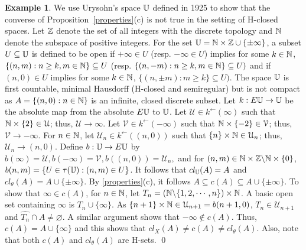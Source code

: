 \documentclass[11pt]{amsart}
\newif\ifdraft\draftfalse
\theoremstyle{definition}
\newtheorem{example}[theorem]{Example}
\theoremstyle{remark}
\numberwithin{equation}{section}
\begin{document}
\vskip 3mm

\begin{example}{{\immediate{}}{\ifdraft\hspace{-\lastskip}\vadjust{\vspace{-1mm}\smash{\llap{{\tt {{Urys}}}\hspace{8mm}}}\vspace{1mm}}\fi}}
We use Urysohn's space  $\Bbb U$ defined in 1925 to show that the converse of Proposition~\ref{properties}(c)  is not true in the setting of H-closed spaces.  Let $\Bbb Z$
denote the set of all integers with the discrete topology and $\Bbb N$
denote the subspace of positive integers.
  For the set $\Bbb U  = \Bbb N \times
\Bbb Z \cup \{\pm \infty\}$, a subset $U\subseteq \Bbb U$  is defined to be
open  if $+\infty\in U$
(resp. $-\infty\in U$) implies for some
$k\in {\Bbb N}$, $\{(n,m):n\geq k, m\in {\Bbb N} \}\subseteq U$ (resp.
$\{({n},{-m}):n\geq k, m\in
{\Bbb N}\}\subseteq U)$ and if $(n,0) \in U$ implies for some $k\in {\Bbb
N}$, $\{({n},{\pm m}):m\geq k
\}\subseteq U)$. The space $\Bbb U$ is first countable,  minimal
Hausdorff (H-closed and semiregular) but is not compact as
$A = \{(n,0): n
\in {\Bbb N}\} $ is an infinite, closed discrete subset.  Let $k: E{\Bbb U} \rightarrow {\Bbb U}$  be the absolute map from the absolute  $E\Bbb U$ to $\Bbb U$. Let $\mathcal U \in k^{\leftarrow}(\infty)$ such that $\Bbb N \times \{2\} \in \mathcal U$; thus, $\mathcal U \rightarrow \infty$.  Let    $\mathcal V \in k^{\leftarrow}(-\infty)$ such that $\Bbb N \times \{-2\} \in {\ensuremath{\mathcal{V}}}$; thus, $\mathcal V \rightarrow -\infty$. For $n \in \Bbb N$, let $\mathcal U_n \in k^{\leftarrow}((n,0))$ such that $\{n\}\times \Bbb N \in \mathcal U_n$; thus, $\mathcal U_n \rightarrow (n,0)$.  
Define $b:\Bbb U \rightarrow E\Bbb U$ by $b(\infty) = \mathcal U, b(-\infty) = \mathcal V, b((n,0)) = {\mathcal U}_n,$ and for $(n,m) \in \Bbb N \times \Bbb Z \backslash \Bbb N \times\{0\}$, $b(n,m) = \{U \in \tau(\Bbb U): (n,m) \in U\}$.  It follows that $cl_{\Bbb U}(A) = A$ and $cl_{\theta}(A) = A \cup \{\pm \infty\}$. By \ref{properties}(c),   it follows $A {\subseteq} c(A) {\subseteq} A \cup \{\pm\infty\}$.  To show that $\infty \in c(A)$, for $n \in \Bbb N$, let $T_n = (\Bbb N \backslash \{1,2,\cdots,n\})\times \Bbb N$.  A basic open set containing $\infty$ is  $T_n \cup \{\infty\}$.  As $\{n+1\}\times \Bbb N \in {\ensuremath{\mathcal{U}}}_{n+1} = b(n+1,0)$, $T_n \in {\ensuremath{\mathcal{U}}}_{n+1}$ and $\hat{T_n} \cap A \ne \varnothing$.  A similar argument shows that $-\infty \not\in c(A)$.
Thus, $c(A) = A \cup \{\infty\}$ and this shows that $cl_X(A) \ne c(A) \ne cl_{\theta}(A)$.  Also, note that both 
 $c(A)$ and $cl_{\theta}(A)$ are H-sets.  \qed
\end{example}
\end{document}
